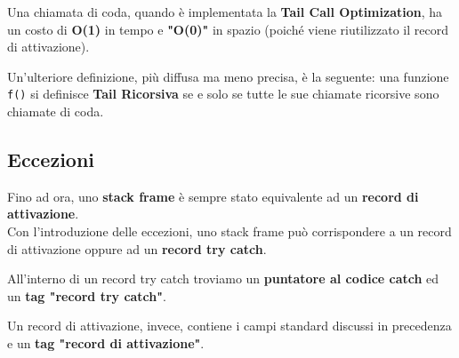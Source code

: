 \documentclass{article}
\begin{document}
Una chiamata di coda, quando è implementata la \textbf{Tail Call Optimization}, ha un costo di \textbf{O(1)} in tempo e \textbf{"O(0)"} in spazio (poiché viene riutilizzato il record di attivazione).

Un'ulteriore definizione, più diffusa ma meno precisa, è la seguente: una funzione \texttt{f()} si definisce \textbf{Tail Ricorsiva} se e solo se tutte le sue chiamate ricorsive sono chiamate di coda.

\subsection*{Eccezioni}
Fino ad ora, uno \textbf{stack frame} è sempre stato equivalente ad un \textbf{record di attivazione}.\\
Con l'introduzione delle eccezioni, uno stack frame può corrispondere a un record di attivazione oppure ad un \textbf{record try catch}.

All'interno di un record try catch troviamo un \textbf{puntatore al codice catch} ed un \textbf{tag "record try catch"}.

Un record di attivazione, invece, contiene i campi standard discussi in precedenza e un \textbf{tag "record di attivazione"}.

\pagebreak
\end{document}
